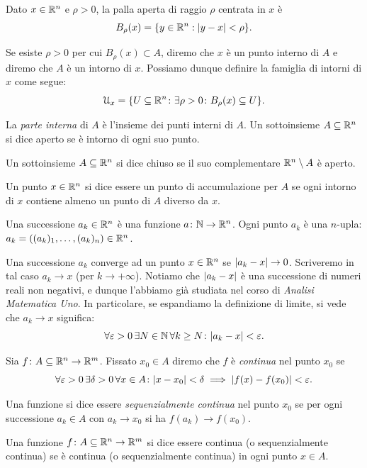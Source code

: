 \begin{definition}[topologia]
Dato $ x \in {\mathbb R}^n$ e $\rho>0$, la palla aperta di raggio $\rho$ centrata in $ x$ è
\[
B_\rho( x) = \{ y \in {\mathbb R}^n : {\left| y -  x\right|} < \rho\}.
\]

Se esiste $\rho>0$ per cui $B_\rho( x) \subset A$, diremo che $ x$ è un punto interno di $A$
e diremo che $A$ è un intorno di $ x$.
Possiamo dunque definire la famiglia di intorni di $ x$ come segue:
\[
  \mathcal U_x = {\left\{ U\subseteq {\mathbb R}^n\colon \exists \rho>0\colon B_\rho( x) \subseteq U \right\}}.
\]

La \emph{parte interna} di $A$ è l'insieme dei punti interni di $A$.
Un sottoinsieme $A\subseteq {\mathbb R}^n$ si dice aperto se 
è intorno di ogni suo punto. 

Un sottoinsieme $A\subseteq {\mathbb R}^n$ si dice chiuso se il suo complementare ${\mathbb R}^n\setminus A$ è aperto.

Un punto $ x\in {\mathbb R}^n$ si dice essere un punto di accumulazione per $A$ 
se ogni intorno di $ x$ contiene almeno un punto di $A$ diverso da $ x$.
\end{definition}

Una successione $ a_k\in {\mathbb R}^n$ è una funzione $ a \colon {\mathbb N}\to {\mathbb R}^n$.
Ogni punto $ a_k$ è una $n$-upla: $ a_k = ((a_k)_1,\dots, (a_k)_n) \in {\mathbb R}^n$.

Una successione $ a_k$ converge ad un punto $ x\in {\mathbb R}^n$ 
se ${\left| a_k -  x\right|}\to 0$.
Scriveremo in tal caso $ a_k \to  x$ (per $k\to +\infty$).
Notiamo che ${\left| a_k- x\right|}$ è una successione di numeri reali 
non negativi, e dunque l'abbiamo già studiata nel corso di \emph{Analisi Matematica Uno}.
In particolare, se espandiamo la definizione di limite, si vede 
che $ a_k \to  x$ significa:
\[
 \forall \varepsilon>0\, \exists N\in {\mathbb N}\, \forall k\ge N\colon {\left| a_k-  x\right|} < \varepsilon.
\]

\begin{definition}[continuità]
Sia $f\colon A \subseteq {\mathbb R}^n \to {\mathbb R}^m$.
Fissato $x_0 \in A$ diremo che $f$ è \emph{continua} nel punto 
$x_0$
se 
\[
\forall \varepsilon>0\, \exists \delta>0 \, \forall x\in A\colon
  {\left|x - x_0\right|} < \delta \implies {\left|f(x) - f(x_0)\right|} < \varepsilon.
\] 

Una funzione si dice essere \emph{sequenzialmente continua} nel punto 
$x_0$ se per ogni successione $a_k\in A$ con $a_k\to x_0$
si ha $f(a_k)\to f(x_0)$.

Una funzione $f\colon A \subseteq {\mathbb R}^n \to {\mathbb R}^m$ si dice essere 
continua (o sequenzialmente continua) se è continua (o sequenzialmente 
continua) in ogni punto $x\in A$.
\end{definition}

